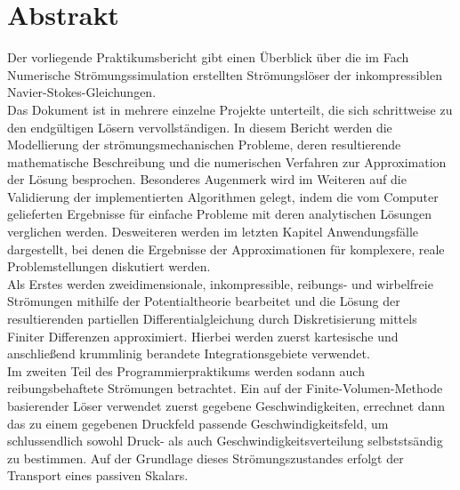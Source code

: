 \chapter*{Abstrakt}
\flushleft
Der vorliegende Praktikumsbericht gibt einen \"Uberblick \"uber die im Fach Numerische Str\"omungssimulation erstellten Str\"omungsl\"oser der inkompressiblen Navier-Stokes-Gleichungen. \\ [0.5cm]

Das Dokument ist in mehrere einzelne Projekte unterteilt, die sich schrittweise zu den endg\"ultigen L\"osern vervollst\"andigen. In diesem Bericht werden die Modellierung der str\"omungsmechanischen Probleme, deren resultierende mathematische Beschreibung und die numerischen Verfahren zur Approximation der L\"osung besprochen. Besonderes Augenmerk wird im Weiteren auf  die Validierung der implementierten Algorithmen gelegt, indem die vom Computer gelieferten Ergebnisse f\"ur einfache Probleme mit deren analytischen L\"osungen verglichen werden. Desweiteren werden im letzten Kapitel Anwendungsf\"alle dargestellt, bei denen die Ergebnisse der Approximationen f\"ur komplexere, reale Problemstellungen diskutiert werden. \\[1cm]

Als Erstes werden zweidimensionale, inkompressible, reibungs- und wirbelfreie Str\"omungen mithilfe der Potentialtheorie bearbeitet und die L\"osung der resultierenden partiellen Differentialgleichung durch Diskretisierung mittels Finiter Differenzen approximiert. Hierbei werden zuerst kartesische und anschlie\ss{}end krummlinig berandete Integrationsgebiete verwendet. \\ [0.5cm]

Im zweiten Teil des Programmierpraktikums werden sodann auch reibungsbehaftete Str\"omungen betrachtet. Ein auf der Finite-Volumen-Methode basierender L\"oser verwendet zuerst gegebene Geschwindigkeiten, errechnet dann das zu einem gegebenen Druckfeld passende Geschwindigkeitsfeld, um schlussendlich sowohl Druck- als auch Geschwindigkeitsverteilung selbststs\"andig zu bestimmen. Auf der Grundlage dieses Str\"omungszustandes erfolgt der Transport eines passiven Skalars.
